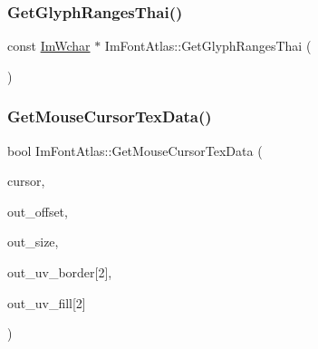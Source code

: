 \mbox{\label{struct_im_font_atlas_a4985c51d8a5270ff027f13fa44a14371}} 
\subsubsection{\texorpdfstring{Get\+Glyph\+Ranges\+Thai()}{GetGlyphRangesThai()}}
{\footnotesize\ttfamily const \mbox{\hyperlink{imgui_8h_af2c7badaf05a0008e15ef76d40875e97}{Im\+Wchar}} $\ast$ Im\+Font\+Atlas\+::\+Get\+Glyph\+Ranges\+Thai (\begin{DoxyParamCaption}{ }\end{DoxyParamCaption})}

\mbox{\label{struct_im_font_atlas_a6d27a36fe034851310dd00d7dc5253c3}} 
\subsubsection{\texorpdfstring{Get\+Mouse\+Cursor\+Tex\+Data()}{GetMouseCursorTexData()}}
{\footnotesize\ttfamily bool Im\+Font\+Atlas\+::\+Get\+Mouse\+Cursor\+Tex\+Data (\begin{DoxyParamCaption}\item[{\mbox{\hyperlink{imgui_8h_a9223d6c82bb5d12c2eab5f829ca520ef}{Im\+Gui\+Mouse\+Cursor}}}]{cursor,  }\item[{\mbox{\hyperlink{struct_im_vec2}{Im\+Vec2}} $\ast$}]{out\+\_\+offset,  }\item[{\mbox{\hyperlink{struct_im_vec2}{Im\+Vec2}} $\ast$}]{out\+\_\+size,  }\item[{\mbox{\hyperlink{struct_im_vec2}{Im\+Vec2}}}]{out\+\_\+uv\+\_\+border\mbox{[}2\mbox{]},  }\item[{\mbox{\hyperlink{struct_im_vec2}{Im\+Vec2}}}]{out\+\_\+uv\+\_\+fill\mbox{[}2\mbox{]} }\end{DoxyParamCaption})}

